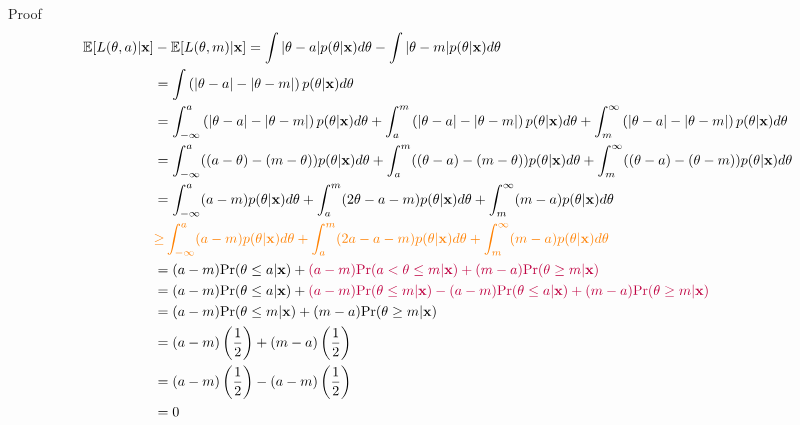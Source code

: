 \documentclass[
  ignorenonframetext,
]{beamer}
\begin{document}
\begin{frame}{Proof}
\protect\hypertarget{proof}{}
\[
\begin{align}
\mathbb{E}[L(\theta , a) | \mathbf{x}] & - \mathbb{E}[L(\theta, m) | \mathbf{x}] = \int |\theta - a| p(\theta | \mathbf{x}) d\theta - \int |\theta - m| p(\theta | \mathbf{x})d\theta \\ 
&= \int \left(|\theta - a| - |\theta - m|\right) p(\theta | \mathbf{x})d\theta  \\
&= \int_{-\infty}^{a} \left(|\theta - a| - |\theta - m|\right) p(\theta | \mathbf{x})d\theta + \int_{a}^{m} \left(|\theta - a| - |\theta - m|\right) p(\theta | \mathbf{x})d\theta + \int_{m}^{\infty} \left(|\theta - a| - |\theta - m|\right) p(\theta | \mathbf{x})d\theta \\
&= \int_{-\infty}^{a} ((a-\theta) - ( m - \theta)) p(\theta | \mathbf{x}) d\theta + \int_{a}^{m} ((\theta - a) - (m- \theta)) p(\theta | \mathbf{x}) d\theta  +
\int_{m}^{\infty} ((\theta - a) - (\theta - m)) p(\theta | \mathbf{x}) d\theta \\
&= \int_{-\infty}^{a} (a - m)  p(\theta | \mathbf{x}) d\theta + \int_{a}^{m} (2\theta - a- m)  p(\theta | \mathbf{x}) d\theta + \int_{m}^{\infty} (m-a) p(\theta | \mathbf{x}) d\theta \\
& \color{orange}{\geq}  \int_{-\infty}^{a} (a - m)  p(\theta | \mathbf{x}) d\theta + \int_{a}^{m} (2\color{orange}{a} - a- m)  p(\theta | \mathbf{x}) d\theta + \int_{m}^{\infty} (m-a) p(\theta | \mathbf{x}) d\theta \\
&= (a-m)\text{Pr}(\theta \leq a | \mathbf{x}) + \color{purple}{(a-m)\text{Pr}(a  < \theta \leq m | \mathbf{x}) }+ (m-a) \text{Pr}(\theta \geq m | \mathbf{x}) \\
&= (a-m)\text{Pr}(\theta \leq a | \mathbf{x}) + \color{purple}{(a-m) \text{Pr}(\theta \leq m | \mathbf{x})  - (a-m) \text{Pr}(\theta \leq a | \mathbf{x})} + (m-a) \text{Pr}(\theta \geq m | \mathbf{x})  \\
&= (a-m) \text{Pr}(\theta \leq m | \mathbf{x}) +  (m-a) \text{Pr}(\theta \geq m | \mathbf{x}) \\
&= (a-m)\left(\frac{1}{2}\right) + (m-a)\left(\frac{1}{2}\right) \\
&= (a-m)\left(\frac{1}{2}\right) - (a-m)\left(\frac{1}{2}\right)\\
&= 0
\end{align}
\]
\end{frame}
\end{document}
